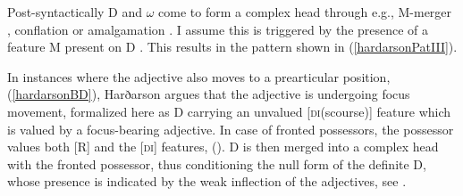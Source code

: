 \documentclass[output=paper,colorlinks,citecolor=brown,
]{langscibook}
\begin{document}
Post-syntactically D and $\omega$ come to form a complex head through e.g., M-merger \citep{Marantz:1988ug,Matushanski:2006ud}, conflation \citep{Harley:2004ue} or amalgamation \citep{Harizanov:2018ep}. I assume this is triggered by the presence of a feature M present on D \citep[cf.][]{Harley:2004ue,Harizanov:2018ep}. This results in the pattern shown in (\ref{hardarsonPatIII}).

\begin{exe}
\end{exe}

In instances where the adjective also moves to a prearticular position, (\ref{hardarsonBD}), Harðarson \citeyearpar[147ff]{Hardarson:2016wd} argues that the adjective is undergoing focus movement, formalized here as D carrying an unvalued [\textsc{di}(scourse)] feature which is valued by a focus-bearing adjective. In case of fronted possessors, the possessor values both [R] and the [\textsc{di}] features, (). D is then merged into a complex head with the fronted possessor, thus conditioning the null form of the definite D, whose presence is indicated by the weak inflection of the adjectives, see .
\end{document}
